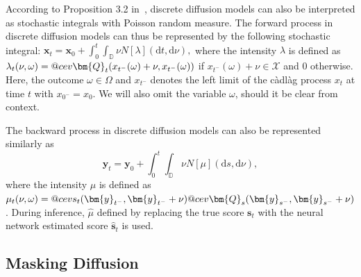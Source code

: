 \documentclass{article}
\makeatletter
\DeclareRobustCommand{\cev}[1]{%
  {\mathpalette\do@cev{#1}}%
}
\newcommand{\do@cev}[2]{%
  \vbox{\offinterlineskip
    \sbox\z@{$\m@th#1 x$}%
    \ialign{##\cr
\hidewidth\reflectbox{$\m@th#1\vec{}\mkern4mu$}\hidewidth\cr
      \noalign{\kern-\ht\z@}
      $\m@th#1#2$\cr
    }%
  }%
}
\def\vs{{\bm{s}}}
\def\vx{{\bm{x}}}
\def\vy{{\bm{y}}}
\def\mQ{{\bm{Q}}}
\def\sD{{\mathbb{D}}}
\newcommand{\R}{\mathbb{R}}
\makeatother
\begin{document}
According to Proposition 3.2 in~\citep{rendiscrete}, discrete diffusion models can also be interpreted as stochastic integrals with Poisson random measure.
%
%
The forward process in discrete diffusion models can thus be represented by the following stochastic integral:
$	\vx_t = \vx_0 + \int_0^t \int_{\sD} \nu  N[\lambda](\mathrm{d} t, \mathrm{d} \nu),$
where the intensity $\lambda$ is defined as
$
	\lambda_t(\nu, \omega) = \cev \mQ_t(x_{t^-}(\omega) + \nu, x_{t^-}(\omega))
$
if $x_{t^-}(\omega) + \nu \in \mathcal{X}$ and 0 otherwise. Here, the outcome $\omega \in \Omega$ and $x_{t^-}$ denotes the left limit of the c\`adl\`ag process $x_t$ at time $t$ with $x_{0^-} = x_0$. We will also omit the variable $\omega$, should it be clear from context.

The backward process in discrete diffusion models can also be represented similarly as
\begin{equation}
	\vy_t = \vy_0 + \int_0^t \int_{\sD} \nu  N[\mu](\mathrm{d} s, \mathrm{d} \nu),
	\label{eq:backward_integral_nu}
\end{equation}
where the intensity $\mu$ is defined as $\mu_t(\nu, \omega) = \cev{s}_t(\vy_{t^-}, \vy_{t^-} + \nu) \cev \mQ_s(\vy_{s^-}, \vy_{s^-} + \nu)$. During inference, $\widehat \mu$ defined by replacing the true score $\vs_t$ with the neural network estimated score $\widehat \vs_t$ is used.

\subsection{Masking Diffusion}
\label{sec:masking-diffusion}
\end{document}
